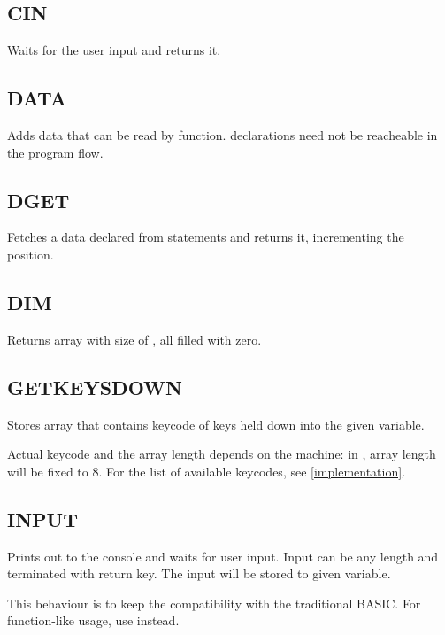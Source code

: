     \subsection{CIN}
        \par
        Waits for the user input and returns it.
    \subsection{DATA}
        \par
        Adds data that can be read by  function.  declarations need not be reacheable in the program flow.
    \subsection{DGET}
        \par
        Fetches a data declared from  statements and returns it, incrementing the  position.
    \subsection{DIM}
        \par
        Returns array with size of , all filled with zero.
    \subsection{GETKEYSDOWN}
        \par
        Stores array that contains keycode of keys held down into the given variable.\par
        Actual keycode and the array length depends on the machine: in \thismachine , array length will be fixed to 8. For the list of available keycodes, see \ref{implementation}.
    \subsection{INPUT}
        \par
        Prints out  to the console and waits for user input. Input can be any length and terminated with return key. The input will be stored to given variable.\par
        This behaviour is to keep the compatibility with the traditional BASIC. For function-like usage, use  instead.

